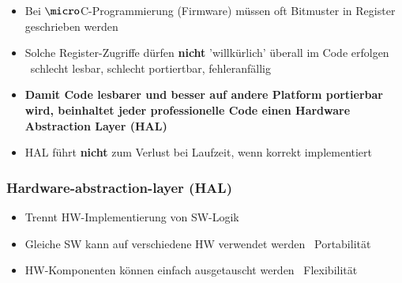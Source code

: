\begin{itemize}
    \item Bei $\micro$C-Programmierung (Firmware) müssen oft Bitmuster in Register geschrieben werden
    \item Solche Register-Zugriffe dürfen \textbf{nicht} 'willkürlich' überall im Code erfolgen \\
        \textrightarrow\ schlecht lesbar, schlecht portiertbar, fehleranfällig
    \item \textbf{Damit Code lesbarer und besser auf andere Platform portierbar wird, beinhaltet jeder professionelle Code einen
        Hardware Abstraction Layer (HAL)}
    \item HAL führt \textbf{nicht} zum Verlust bei Laufzeit, wenn korrekt implementiert
\end{itemize}


\subsubsection{Hardware-abstraction-layer (HAL)}

\begin{itemize}
    \item Trennt HW-Implementierung von SW-Logik
    \item Gleiche SW kann auf verschiedene HW verwendet werden \textrightarrow\ Portabilität
    \item HW-Komponenten können einfach ausgetauscht werden \textrightarrow\ Flexibilität
\end{itemize}

